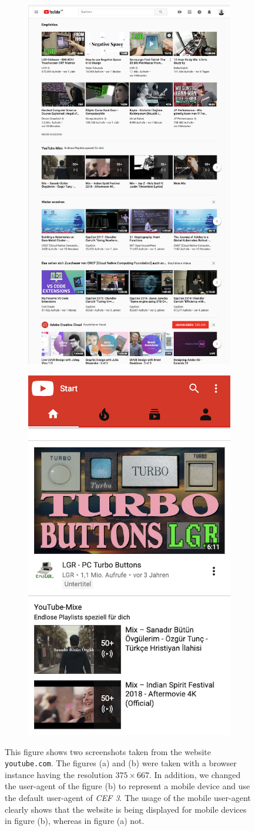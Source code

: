 \begin{figure}
	\centering
	\begin{subfigure}{0.6\textwidth}
		\centering
		\includegraphics[width=0.5\linewidth]{resources/screenshot_resolution}
		\caption{}
		\label{compare_resolution}
	\end{subfigure}%
	\begin{subfigure}{0.6\textwidth}
		\centering
		\includegraphics[width=0.5\linewidth]{resources/screenshot_resolutionanduseragent}
		\caption{}
		\label{compare_useragent}
	\end{subfigure}
	\caption{This figure shows two screenshots taken from the website \texttt{youtube.com}. The figures (a) and (b) were taken with a browser instance having the resolution $375 \times 667$. In addition, we changed the user-agent of the figure (b) to represent a mobile device and use the default user-agent of \textit{CEF 3}. The usage of the mobile user-agent clearly shows that the website is being displayed for mobile devices in figure (b), whereas in figure (a) not.}
	\label{compare_resolution_useragent}
\end{figure}

